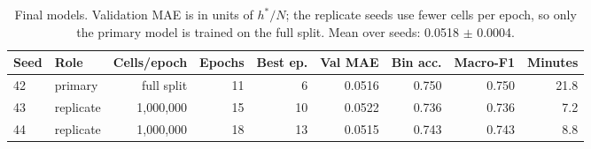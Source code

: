 \begin{table}[H]
\centering
\small
\caption{Final models. Validation MAE is in units of $h^*/N$; the replicate seeds use fewer cells per epoch, so only the primary model is trained on the full split. Mean over seeds: 0.0518 $\pm$ 0.0004.}
\label{tab:final_training}
\begin{tabular}{llrrrrrrr}
\toprule
Seed & Role & Cells/epoch & Epochs & Best ep. & Val MAE & Bin acc. & Macro-F1 & Minutes \\
\midrule
42 & primary & full split & 11 & 6 & 0.0516 & 0.750 & 0.750 & 21.8 \\
43 & replicate & 1{,}000{,}000 & 15 & 10 & 0.0522 & 0.736 & 0.736 & 7.2 \\
44 & replicate & 1{,}000{,}000 & 18 & 13 & 0.0515 & 0.743 & 0.743 & 8.8 \\
\bottomrule
\end{tabular}
\end{table}

